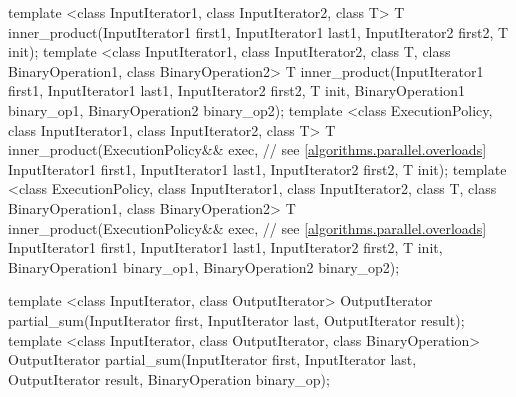 \begin{codeblock}
{  template <class InputIterator1, class InputIterator2, class T>
    T inner_product(InputIterator1 first1, InputIterator1 last1,
                    InputIterator2 first2, T init);
  template <class InputIterator1, class InputIterator2, class T,
            class BinaryOperation1, class BinaryOperation2>
    T inner_product(InputIterator1 first1, InputIterator1 last1,
                    InputIterator2 first2, T init,
                    BinaryOperation1 binary_op1,
                    BinaryOperation2 binary_op2);
  template <class ExecutionPolicy, class InputIterator1, class InputIterator2,
            class T>
    T inner_product(ExecutionPolicy&& exec, // see \ref{algorithms.parallel.overloads}
                    InputIterator1 first1, InputIterator1 last1,
                    InputIterator2 first2, T init);
  template <class ExecutionPolicy, class InputIterator1, class InputIterator2,
            class T, class BinaryOperation1, class BinaryOperation2>
    T inner_product(ExecutionPolicy&& exec, // see \ref{algorithms.parallel.overloads}
                    InputIterator1 first1, InputIterator1 last1,
                    InputIterator2 first2, T init,
                    BinaryOperation1 binary_op1,
                    BinaryOperation2 binary_op2);

  template <class InputIterator, class OutputIterator>
    OutputIterator partial_sum(InputIterator first,
                               InputIterator last,
                               OutputIterator result);
  template <class InputIterator, class OutputIterator, class BinaryOperation>
    OutputIterator partial_sum(InputIterator first,
                               InputIterator last,
                               OutputIterator result,
                               BinaryOperation binary_op);

}
\end{codeblock}
